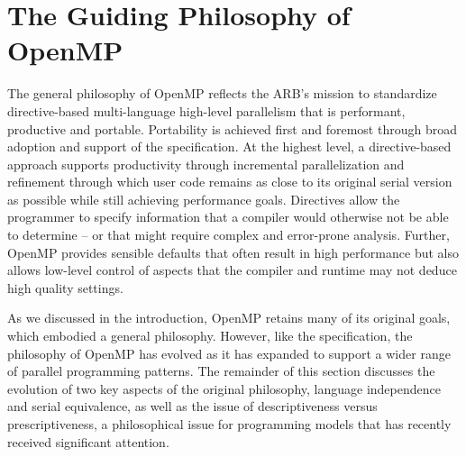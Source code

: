\section{The Guiding Philosophy of OpenMP}
\label{sec:philosophy}

The general philosophy of OpenMP reflects the ARB's mission to standardize 
directive-based multi-language high-level parallelism that is performant, 
productive and portable. Portability is achieved first and foremost through
broad adoption and support of the specification. At the highest level, a 
directive-based approach supports productivity through incremental 
parallelization and refinement through which user code remains as close 
to its original serial version as possible while still achieving performance 
goals. Directives allow the programmer to specify information that a compiler
would otherwise not be able to determine -- or that might require complex
and error-prone analysis. Further, OpenMP provides sensible defaults that 
often result in high performance but also allows low-level control of 
aspects that the compiler and runtime may not deduce high quality settings.

As we discussed in the introduction, OpenMP retains many of its original
goals, which embodied a general philosophy. However, like the specification, 
the philosophy of OpenMP has evolved as it has expanded to support a wider
range of parallel programming patterns. The remainder of this section 
discusses the evolution of two key aspects of the original philosophy,
language independence and serial equivalence, as well as the issue of
descriptiveness versus prescriptiveness, a philosophical issue for 
programming models that has recently received significant attention.




